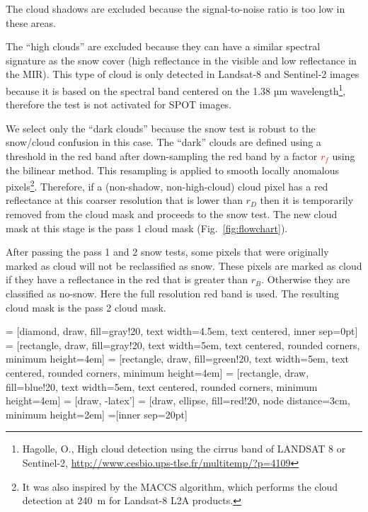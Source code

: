 \documentclass[a4paper]{article}
\begin{document}
The cloud shadows are excluded because the signal-to-noise ratio is too low in these areas. 

The ``high clouds'' are excluded because they can have a similar spectral signature as the snow cover (high reflectance in the visible and low reflectance in the MIR). This type of cloud is only detected in Landsat-8 and Sentinel-2 images because it is based on the spectral band centered on the 1.38 µm wavelength\footnote{Hagolle, O., High cloud detection using the cirrus band of LANDSAT 8 or Sentinel-2, \url{http://www.cesbio.ups-tlse.fr/multitemp/?p=4109}}, therefore the test is not activated for SPOT images.

We select only the ``dark clouds'' because the snow test is robust to the snow/cloud confusion in this case. The ``dark'' clouds are defined using a threshold in the red band after down-sampling the red band by a factor \textcolor{red}{$r_f$} using the bilinear method. This resampling is applied to smooth locally anomalous pixels\footnote{It was also inspired by the MACCS algorithm, which performs the cloud detection at 240~m for Landsat-8 L2A products.}. Therefore, if a (non-shadow, non-high-cloud) cloud pixel has a red reflectance at this coarser resolution that is lower than $r_D$ then it is temporarily removed from the cloud mask and proceeds to the snow test. The new cloud mask at this stage is the pass 1 cloud mask (Fig.~\ref{fig:flowchart}). 

After passing the pass 1 and 2 snow tests, some pixels that were originally marked as cloud will not be reclassified as snow. These pixels are marked as cloud if they have a reflectance in the red that is greater than $r_B$. Otherwise they are classified as no-snow. Here the full resolution red band is used. The resulting cloud mask is the pass 2 cloud mask. 

\pagestyle{empty}

 = [diamond, draw, fill=gray!20, 
    text width=4.5em, text centered, inner sep=0pt]
 = [rectangle, draw, fill=gray!20, 
    text width=5em, text centered, rounded corners, minimum height=4em]
 = [rectangle, draw, fill=green!20, 
    text width=5em, text centered, rounded corners, minimum height=4em]
 = [rectangle, draw, fill=blue!20, 
    text width=5em, text centered, rounded corners, minimum height=4em]
 = [draw, -latex']
 = [draw, ellipse, fill=red!20, node distance=3cm,
    minimum height=2em]
=[inner sep=20pt]
\end{document}
